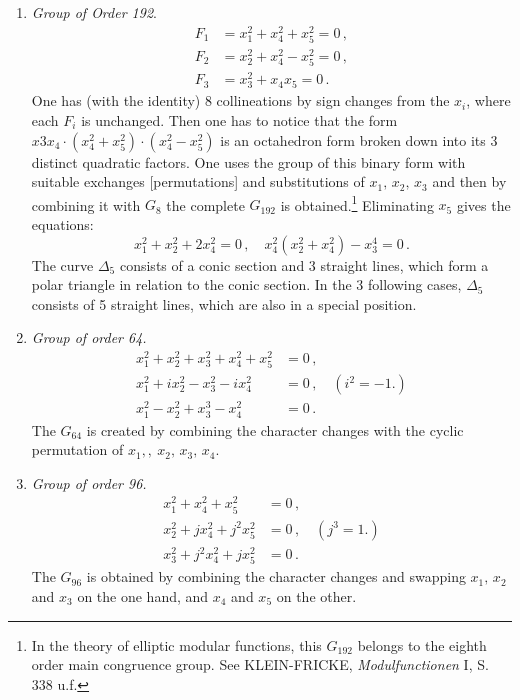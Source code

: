 \documentclass[leqno]{article}
\begin{document}
\begin{enumerate}[label=\arabic*)]
	\item \textit{Group of Order 192}.
	\begin{align*}
		F_1 &= x_1^2 + x_4^2 + x_5^2 = 0 \, , \\
		F_2 &= x_2^2 + x_4^2 - x_5^2 = 0 \, , \\
		F_3 &= x_3^2 + x_4 x_5 = 0 \, . 
	\end{align*}
    One has (with the identity) 8 collineations by sign changes from the $x_i$, where each $F_i$ is unchanged. Then one has to notice that the form $x3 x_4 \cdot (x_4^2 + x_5^2) \cdot (x_4^2 - x_5^2)$ is an octahedron form broken down into its 3 distinct quadratic factors. One uses the group of this binary form with suitable exchanges [permutations] and substitutions of $x_1, \, x_2, \, x_3$ and then by combining it with $G_8$ the complete $G_{192}$ is obtained.\footnote{In the theory of elliptic modular functions, this $G_{192}$ belongs to the eighth order main congruence group. See KLEIN-FRICKE, \textit{Modulfunctionen} I, S. 338 u.f.} Eliminating $x_5$ gives the equations:
    \[
    x_1^2 + x_2^2 + 2x_4^2 = 0 \, , \quad x_4^2(x_2^2 + x_4^2) - x_3^4 = 0 \, . 
    \]
    The curve $\Delta_5$ consists of a conic section and 3 straight lines, which form a polar triangle in relation to the conic section. In the 3 following cases, $\Delta_5$ consists of 5 straight lines, which are also in a special position.
    \item \textit{Group of order 64.}
    \begin{align*}
    	x_1^2 + x_2^2 + x_3^2 + x_4^2 + x_5^2 &= 0 \, , \\
    	x_1^2 + i x_2^2 - x_3^2 - i x_4^2 &= 0 \, , \quad (i^2=-1.) \\
    	x_1^2 - x_2^2 + x_3^3 - x_4^2 &= 0 \, . 
    \end{align*}
    The $G_{64}$ is created by combining the character changes with the cyclic permutation of $x_1, ,\ x_2, \, x_3, \, x_4.$
    \item \textit{Group of order 96.}
    \begin{align*}
    	x_1^2 + x_4^2 + x_5^2 &= 0 \, , \\
    	x_2^2 + j x_4^2 + j^2 x_5^2 &= 0 \, , \quad (j^3=1.) \\
    	x_3^2 + j^2 x_4^2 + j x_5^2 &= 0 \, . 
    \end{align*}
    The $G_{96}$ is obtained by combining the character changes and swapping $x_1, \, x_2$ and $x_3$ on the one hand, and $x_4$ and $x_5$ on the other.

\end{enumerate}
\end{document}
